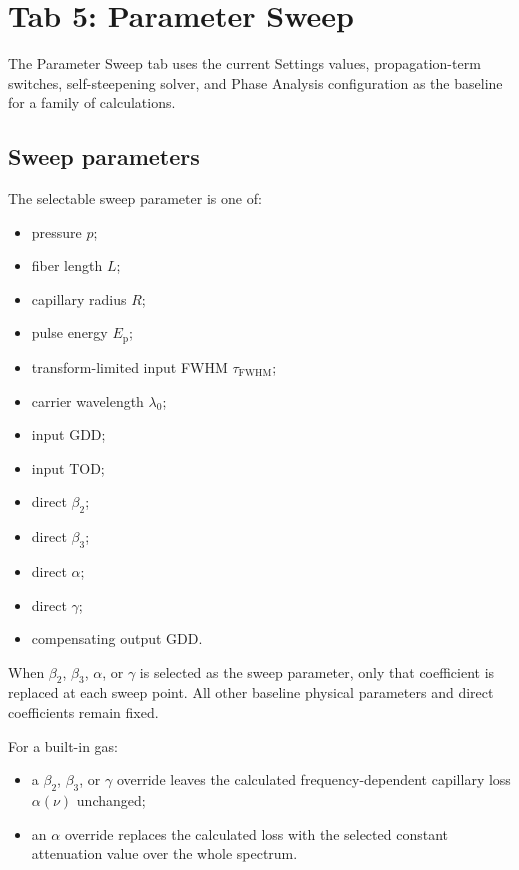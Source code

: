 \documentclass[11pt,a4paper]{article}
\newcommand{\FWHM}{\mathrm{FWHM}}
\begin{document}
\section{Tab 5: Parameter Sweep}

The Parameter Sweep tab uses the current Settings values, propagation-term
switches, self-steepening solver, and Phase Analysis configuration as the
baseline for a family of calculations.

\subsection{Sweep parameters}

The selectable sweep parameter is one of:

\begin{itemize}
    \item pressure $p$;
    \item fiber length $L$;
    \item capillary radius $R$;
    \item pulse energy $E_{\mathrm p}$;
    \item transform-limited input FWHM $\tau_{\FWHM}$;
    \item carrier wavelength $\lambda_0$;
    \item input GDD;
    \item input TOD;
    \item direct $\beta_2$;
    \item direct $\beta_3$;
    \item direct $\alpha$;
    \item direct $\gamma$;
    \item compensating output GDD.
\end{itemize}

When $\beta_2$, $\beta_3$, $\alpha$, or $\gamma$ is selected as the sweep
parameter, only that coefficient is replaced at each sweep point. All other
baseline physical parameters and direct coefficients remain fixed.

For a built-in gas:

\begin{itemize}
    \item a $\beta_2$, $\beta_3$, or $\gamma$ override leaves the calculated
    frequency-dependent capillary loss $\alpha(\nu)$ unchanged;
    \item an $\alpha$ override replaces the calculated loss with the selected
    constant attenuation value over the whole spectrum.
\end{itemize}
\end{document}
